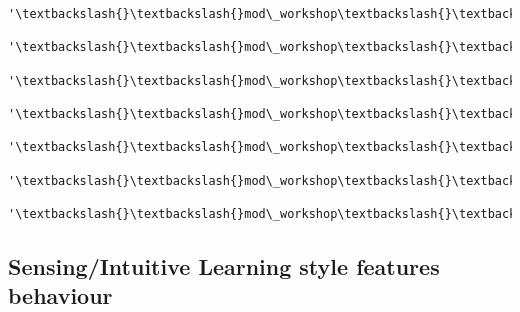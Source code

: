 \documentclass[11pt]{article}
\begin{document}
\begin{Verbatim}[commandchars=\\\{\}]
          '\textbackslash{}\textbackslash{}mod\_workshop\textbackslash{}\textbackslash{}event\textbackslash{}\textbackslash{}assessable\_uploaded',
          '\textbackslash{}\textbackslash{}mod\_workshop\textbackslash{}\textbackslash{}event\textbackslash{}\textbackslash{}assessment\_evaluated',
          '\textbackslash{}\textbackslash{}mod\_workshop\textbackslash{}\textbackslash{}event\textbackslash{}\textbackslash{}course\_module\_viewed',
          '\textbackslash{}\textbackslash{}mod\_workshop\textbackslash{}\textbackslash{}event\textbackslash{}\textbackslash{}submission\_assessed',
          '\textbackslash{}\textbackslash{}mod\_workshop\textbackslash{}\textbackslash{}event\textbackslash{}\textbackslash{}submission\_created',
          '\textbackslash{}\textbackslash{}mod\_workshop\textbackslash{}\textbackslash{}event\textbackslash{}\textbackslash{}submission\_reassessed',
          '\textbackslash{}\textbackslash{}mod\_workshop\textbackslash{}\textbackslash{}event\textbackslash{}\textbackslash{}submission\_viewed']
\end{Verbatim}
            
    \subsection{Sensing/Intuitive Learning style features
behaviour}\label{sensingintuitive-learning-style-features-behaviour}
\end{document}
